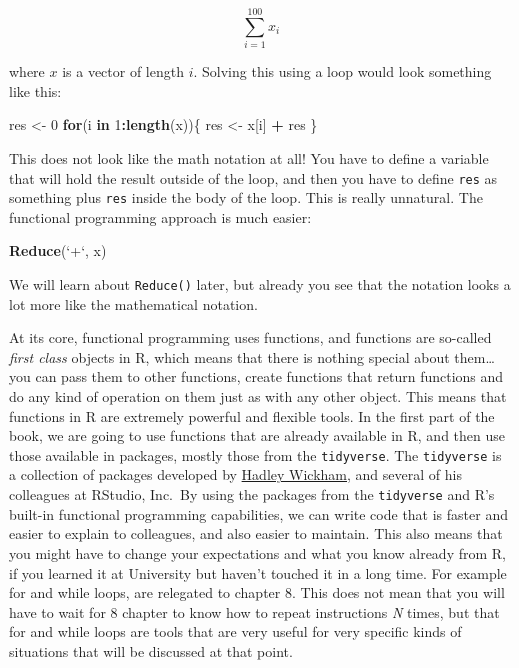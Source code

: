 \documentclass[]{gitbook}
\newenvironment{Shaded}{\begin{snugshade}}{\end{snugshade}}
\newcommand{\ControlFlowTok}[1]{\textcolor[rgb]{0.13,0.29,0.53}{\textbf{#1}}}
\newcommand{\DataTypeTok}[1]{\textcolor[rgb]{0.13,0.29,0.53}{#1}}
\newcommand{\DecValTok}[1]{\textcolor[rgb]{0.00,0.00,0.81}{#1}}
\newcommand{\KeywordTok}[1]{\textcolor[rgb]{0.13,0.29,0.53}{\textbf{#1}}}
\newcommand{\NormalTok}[1]{#1}
\newcommand{\OperatorTok}[1]{\textcolor[rgb]{0.81,0.36,0.00}{\textbf{#1}}}
\newcommand{\StringTok}[1]{\textcolor[rgb]{0.31,0.60,0.02}{#1}}
\theoremstyle{definition}
\theoremstyle{definition}
\theoremstyle{definition}
\theoremstyle{remark}
\begin{document}
\[
\sum_{i = 1}^{100} x_{i}
\]

where \(x\) is a vector of length \(i\). Solving this using a loop would
look something like this:

\begin{Shaded}
\begin{Highlighting}[]
\NormalTok{res <-}\StringTok{ }\DecValTok{0}
\ControlFlowTok{for}\NormalTok{(i }\ControlFlowTok{in} \DecValTok{1}\OperatorTok{:}\KeywordTok{length}\NormalTok{(x))\{}
\NormalTok{  res <-}\StringTok{ }\NormalTok{x[i] }\OperatorTok{+}\StringTok{ }\NormalTok{res}
\NormalTok{\}}
\end{Highlighting}
\end{Shaded}

This does not look like the math notation at all! You have to define a
variable that will hold the result outside of the loop, and then you
have to define \texttt{res} as something plus \texttt{res} inside the
body of the loop. This is really unnatural. The functional programming
approach is much easier:

\begin{Shaded}
\begin{Highlighting}[]
\KeywordTok{Reduce}\NormalTok{(}\StringTok{`}\DataTypeTok{+}\StringTok{`}\NormalTok{, x)}
\end{Highlighting}
\end{Shaded}

We will learn about \texttt{Reduce()} later, but already you see that
the notation looks a lot more like the mathematical notation.

At its core, functional programming uses functions, and functions are
so-called \emph{first class} objects in R, which means that there is
nothing special about them\ldots{} you can pass them to other functions,
create functions that return functions and do any kind of operation on
them just as with any other object. This means that functions in R are
extremely powerful and flexible tools. In the first part of the book, we
are going to use functions that are already available in R, and then use
those available in packages, mostly those from the \texttt{tidyverse}.
The \texttt{tidyverse} is a collection of packages developed by
\href{http://hadley.nz/}{Hadley Wickham}, and several of his colleagues
at RStudio, Inc.~By using the packages from the \texttt{tidyverse} and
R's built-in functional programming capabilities, we can write code that
is faster and easier to explain to colleagues, and also easier to
maintain. This also means that you might have to change your
expectations and what you know already from R, if you learned it at
University but haven't touched it in a long time. For example for and
while loops, are relegated to chapter 8. This does not mean that you
will have to wait for 8 chapter to know how to repeat instructions
\emph{N} times, but that for and while loops are tools that are very
useful for very specific kinds of situations that will be discussed at
that point.
\end{document}

